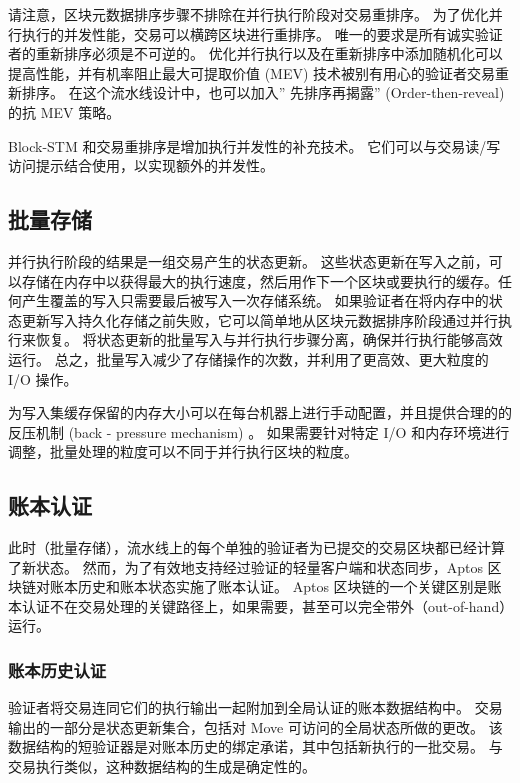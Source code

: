 \documentclass{article}
\begin{document}
请注意，区块元数据排序步骤不排除在并行执行阶段对交易重排序。 为了优化并行执行的并发性能，交易可以横跨区块进行重排序。 唯一的要求是所有诚实验证者的重新排序必须是不可逆的。 优化并行执行以及在重新排序中添加随机化可以提高性能，并有机率阻止最大可提取价值 (MEV) 技术被别有用心的验证者交易重新排序。 在这个流水线设计中，也可以加入” 先排序再揭露” (Order-then-reveal) 的抗 MEV 策略。

Block-STM 和交易重排序是增加执行并发性的补充技术。 它们可以与交易读/写访问提示结合使用，以实现额外的并发性。

\subsection{批量存储}
并行执行阶段的结果是一组交易产生的状态更新。 这些状态更新在写入之前，可以存储在内存中以获得最大的执行速度，然后用作下一个区块或要执行的缓存。任何产生覆盖的写入只需要最后被写入一次存储系统。 如果验证者在将内存中的状态更新写入持久化存储之前失败，它可以简单地从区块元数据排序阶段通过并行执行来恢复。 将状态更新的批量写入与并行执行步骤分离，确保并行执行能够高效运行。 总之，批量写入减少了存储操作的次数，并利用了更高效、更大粒度的 I/O 操作。

为写入集缓存保留的内存大小可以在每台机器上进行手动配置，并且提供合理的的反压机制 (back - pressure mechanism) 。 如果需要针对特定 I/O 和内存环境进行调整，批量处理的粒度可以不同于并行执行区块的粒度。

\subsection{账本认证}

此时（批量存储），流水线上的每个单独的验证者为已提交的交易区块都已经计算了新状态。 然而，为了有效地支持经过验证的轻量客户端和状态同步，Aptos 区块链对账本历史和账本状态实施了账本认证。 Aptos 区块链的一个关键区别是账本认证不在交易处理的关键路径上，如果需要，甚至可以完全带外（out-of-hand）运行。


\subsubsection{账本历史认证}
\label{subsubsec:ledger_history_certification}

验证者将交易连同它们的执行输出一起附加到全局认证的账本数据结构中。 交易输出的一部分是状态更新集合，包括对 Move 可访问的全局状态所做的更改。 该数据结构的短验证器是对账本历史的绑定承诺，其中包括新执行的一批交易。 与交易执行类似，这种数据结构的生成是确定性的。
\end{document}
